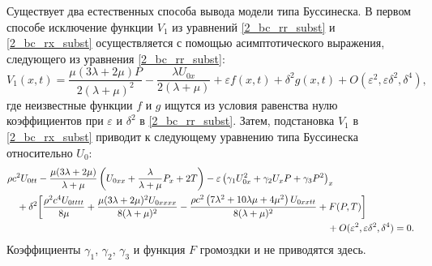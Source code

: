 \documentclass[12pt, a4paper]{article}
\begin{document}
Существует два естественных способа вывода модели типа Буссинеска. В первом способе исключение функции $V_1$ из уравнений \eqref{2_bc_rr_subst} и \eqref{2_bc_rx_subst} осуществляется с помощью асимптотического выражения, следующего из уравнения \eqref{2_bc_rr_subst}:
\begin{equation} \label{v1_asympt}
V_1(x, t) = \frac{\mu(3\lambda + 2\mu) P}{2(\lambda + \mu)^2} - \frac{\lambda U_{0x}}{2(\lambda + \mu)} + \varepsilon f(x,t) + \delta^2 g(x,t) + O(\varepsilon^2, \varepsilon\delta^2, \delta^4),
\end{equation}
где неизвестные функции $f$ и $g$ ищутся из условия равенства нулю коэффициентов при $\varepsilon$ и $\delta^2$ в \eqref{2_bc_rr_subst}. Затем, подстановка $V_1$ в \eqref{2_bc_rx_subst} приводит к следующему уравнению типа Буссинеска относительно $U_0$:
\begin{equation} \label{eq_u0_asympt}
\begin{split}
&\rho c^2 U_{0tt} - \frac{\mu(3\lambda + 2\mu)}{\lambda + \mu}\left(U_{0xx} + \frac{\lambda}{\lambda + \mu} P_x + 2T\right) - \varepsilon \left(\gamma_1 U_{0x}^2 + \gamma_2 U_x P + \gamma_3 P^2 \right)_x \\
&\quad+ \delta^2 \bigg[\frac{\rho ^2 c^4 U_{0tttt}}{8\mu} + \frac{\mu (3\lambda + 2\mu)^2 U_{0xxxx}}{8(\lambda + \mu)^2} - \frac{\rho c^2 \left(7\lambda^2 + 10\lambda\mu + 4\mu^2\right) U_{0xxtt}}{8(\lambda + \mu)^2} + F(P, T) \bigg]\\
&\hspace{117mm}+ O(\varepsilon^2, \varepsilon\delta^2, \delta^4) = 0.
\end{split}
\end{equation}
Коэффициенты $\gamma_1$, $\gamma_2$, $\gamma_3$ и функция $F$ громоздки и не приводятся здесь.
\end{document}
